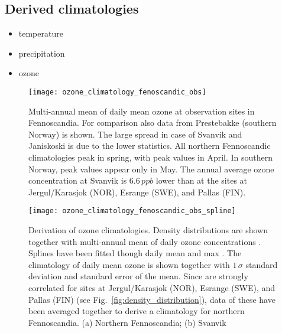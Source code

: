\documentclass[bg, manuscript]{copernicus}
\begin{document}
\subsection{Derived climatologies}
\begin{itemize}
\item temperature
\item precipitation
\item ozone
\end{itemize}

\begin{figure}[t]
  \texttt{[image: ozone\_climatology\_fenoscandic\_obs]}
  \caption{Multi-annual mean of daily mean ozone at observation sites in Fennoscandia. For comparison also data from Prestebakke (southern Norway) is shown. The large spread in case of Svanvik and Janiskoski is due to the lower statistics. All northern Fennoscandic climatologies peak in spring, with peak values in April. In southern Norway, peak values appear only in May. The annual average ozone concentration \chem{\left<[O_3]\right>} at Svanvik is $6.6\,\unit{ppb}$ lower than at the sites at Jergul/Karasjok (NOR), Esrange (SWE), and Pallas (FIN).}
  \label{fig:ozone_climatology_fenoscandic_obs}
\end{figure}


\begin{figure}[t]
  \texttt{[image: ozone\_climatology\_fenoscandic\_obs\_spline]}
  \caption{Derivation of ozone climatologies. Density distributions are shown together with multi-annual mean of daily ozone concentrations \chem{[O_3]}. Splines have been fitted though daily mean and max \chem{[O_3]}. The climatology of daily mean ozone is shown together with $1\,\sigma$ standard deviation and standard error of the mean. Since \chem{[O_3]} are strongly correlated for sites at Jergul/Karasjok (NOR), Esrange (SWE), and Pallas (FIN) (see Fig.~\ref{fig:density_distribution}), data of these have been averaged together to derive a climatology for northern Fennoscandia. (a) Northern Fennoscandia; (b) Svanvik}
  \label{fig:ozone_climatology_fenoscandic_obs_spline}
\end{figure}
\end{document}
